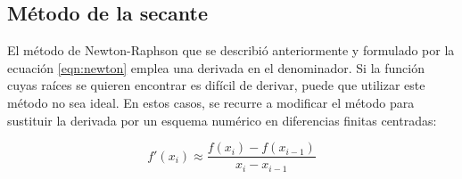 \subsection{Método de la secante}

El método de Newton-Raphson que se describió anteriormente y formulado por la
ecuación \ref{eqn:newton} emplea una derivada en el denominador. Si la función
cuyas raíces se quieren encontrar es difícil de derivar, puede que utilizar este
método no sea ideal. En estos casos, se recurre a modificar el método para
sustituir la derivada por un esquema numérico en diferencias finitas centradas:

\[
	f'(x_i) \approx \frac{f(x_i) - f(x_{i-1})}{x_i - x_{i-1}}
\]
